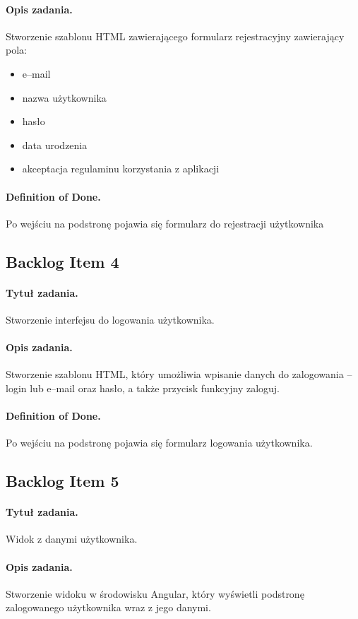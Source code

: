 ﻿\documentclass[a4paper]{article}
\begin{document}
\paragraph{Opis zadania.} Stworzenie szablonu HTML zawierającego formularz rejestracyjny zawierający pola: 
\begin{itemize}
\item e--mail
\item nazwa użytkownika
\item hasło
\item data urodzenia
\item akceptacja regulaminu korzystania z aplikacji
\end{itemize}
\paragraph{Definition of Done.} Po wejściu na podstronę pojawia się formularz do rejestracji użytkownika

 
\subsection{Backlog Item 4} 
\paragraph{Tytuł zadania.} Stworzenie interfejsu do logowania użytkownika.
\paragraph{Opis zadania.} Stworzenie szablonu HTML, który umożliwia wpisanie danych do zalogowania -- login lub e--mail oraz hasło, a także przycisk funkcyjny zaloguj.
\paragraph{Definition of Done.} Po wejściu na podstronę pojawia się formularz logowania użytkownika.

\subsection{Backlog Item 5} 
\paragraph{Tytuł zadania.} Widok z danymi użytkownika.
\paragraph{Opis zadania.} Stworzenie widoku w środowisku Angular, który wyświetli podstronę zalogowanego użytkownika wraz z jego danymi.
\end{document}
